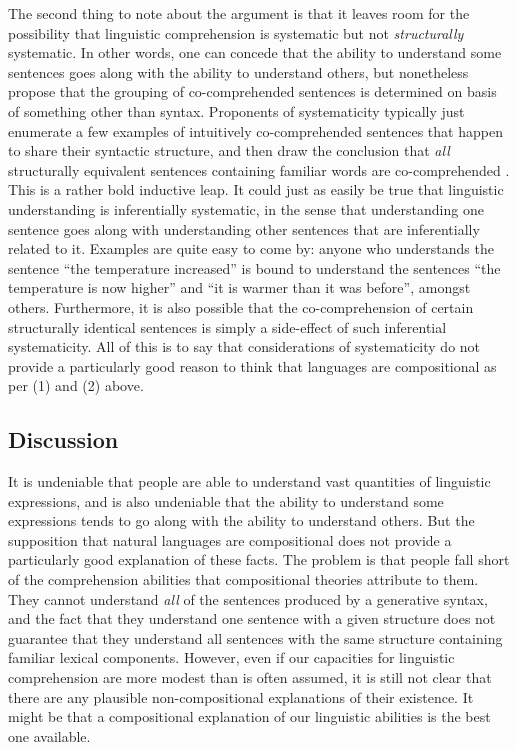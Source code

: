 The second thing to note about the argument is that it leaves room for the possibility that linguistic comprehension is systematic but not \textit{structurally} systematic. In other words, one can concede that the ability to understand some sentences goes along with the ability to understand others, but nonetheless propose that the grouping of co-comprehended sentences is determined on basis of something other than syntax. Proponents of systematicity typically just enumerate a few examples of intuitively co-comprehended sentences that happen to share their syntactic structure, and then draw the conclusion that \textit{all} structurally equivalent sentences containing familiar words are co-comprehended \citep[e.g.][]{FodorPylyshyn:1988}. This is a rather bold inductive leap. It could just as easily be true that linguistic understanding is inferentially systematic, in the sense that understanding one sentence goes along with understanding other sentences that are inferentially related to it. Examples are quite easy to come by: anyone who understands the sentence ``the temperature increased'' is bound to understand the sentences ``the temperature is now higher'' and ``it is warmer than it was before'', amongst others. Furthermore, it is also possible that the co-comprehension of certain structurally identical sentences is simply a side-effect of such inferential systematicity. All of this is to say that considerations of systematicity do not provide a particularly good reason to think that languages are compositional as per (1) and (2) above. 

\subsection{Discussion}

It is undeniable that people are able to understand vast quantities of linguistic expressions, and is also undeniable that the ability to understand some expressions tends to go along with the ability to understand others. But the supposition that natural languages are compositional does not provide a particularly good explanation of these facts. The problem is that people fall short of the comprehension abilities that compositional theories attribute to them. They cannot understand \textit{all} of the sentences produced by a generative syntax, and the fact that they understand one sentence with a given structure does not guarantee that they understand all sentences with the same structure containing familiar lexical components. However, even if our capacities for linguistic comprehension are more modest than is often assumed, it is still not clear that there are any plausible non-compositional explanations of their existence. It might be that a compositional explanation of our linguistic abilities is the best one available. 

